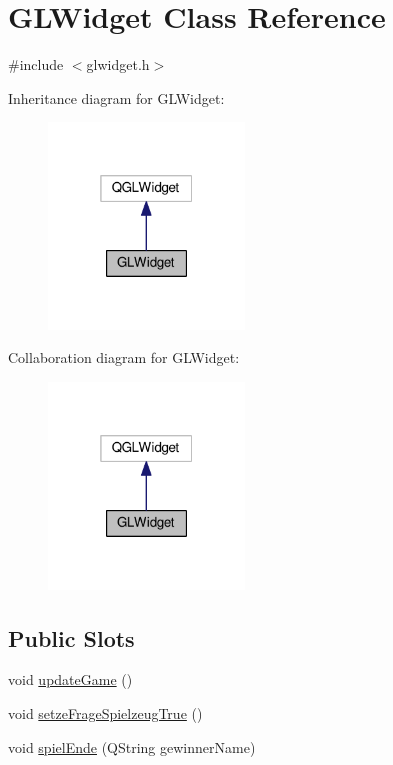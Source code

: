 \hypertarget{classGLWidget}{\section{G\-L\-Widget Class Reference}
\label{classGLWidget}
}


{\ttfamily \#include $<$glwidget.\-h$>$}



Inheritance diagram for G\-L\-Widget\-:\nopagebreak
\begin{figure}[H]
\begin{center}
\leavevmode
\includegraphics[width=148pt]{classGLWidget__inherit__graph}
\end{center}
\end{figure}


Collaboration diagram for G\-L\-Widget\-:\nopagebreak
\begin{figure}[H]
\begin{center}
\leavevmode
\includegraphics[width=148pt]{classGLWidget__coll__graph}
\end{center}
\end{figure}
\subsection*{Public Slots}
\begin{DoxyCompactItemize}
\item 
void \hyperlink{classGLWidget_a956079012f63513b1e9a5a764023553e}{update\-Game} ()
\item 
void \hyperlink{classGLWidget_a433268187ea9021a519991ff69a79a09}{setze\-Frage\-Spielzeug\-True} ()
\item 
void \hyperlink{classGLWidget_a236d12dd5c8593339b1bbe7c1350586b}{spiel\-Ende} (Q\-String gewinner\-Name)
\end{DoxyCompactItemize}
